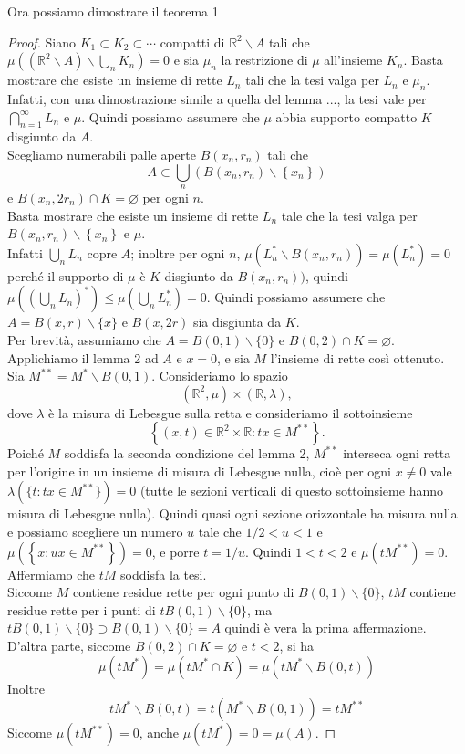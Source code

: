 \documentclass[a4paper, twoside,openright]{article}
\newcommand{\<}{\langle}
\renewcommand{\>}{\rangle}
\begin{document}
Ora possiamo dimostrare il teorema 1
\begin{proof}
Siano $K_{1} \subset K_{2} \subset \cdots$ compatti di $\mathbb{R}^{2} \backslash A$ tali che $\mu\left(\left(\mathbb{R}^{2} \backslash A\right) \backslash \bigcup_{n} K_{n}\right)=0$ e sia $\mu_{n}$ la restrizione di $\mu$ all'insieme $K_{n}$. Basta mostrare che esiste un insieme di rette $L_{n}$ tali che la tesi valga per $L_{n}$ e $\mu_{n}$. Infatti, con una dimostrazione simile a quella del lemma ..., la tesi vale per $\bigcap_{n=1}^{\infty} L_{n}$ e $\mu$. Quindi possiamo assumere che $\mu$ abbia supporto compatto $K$ disgiunto da $A$.\\
Scegliamo numerabili palle aperte $B\left(x_{n}, r_{n}\right)$ tali che
$$
A \subset \bigcup_{n}\left(B\left(x_{n}, r_{n}\right) \backslash\left\{x_{n}\right\}\right)
$$
e $B\left(x_{n}, 2 r_{n}\right) \cap K=\varnothing$ per ogni $n$.\\
Basta mostrare che esiste un insieme di rette $L_{n}$ tale che la tesi valga per $B\left(x_{n}, r_{n}\right) \backslash\left\{x_{n}\right\}$ e $\mu$.\\
Infatti $\bigcup_n L_n$ copre $A$; inoltre per ogni $n$, $\mu(L_n^* \backslash B(x_n,r_n))=\mu(L_n^*)=0$ perché il supporto di $\mu$ è $K$ disgiunto da $B(x_n,r_n))$, quindi $\mu((\bigcup_nL_n)^*) \leq \mu(\bigcup_n L_n^*)=0$. Quindi possiamo assumere che $A=B(x, r) \backslash\{x\}$ e $B(x, 2 r)$ sia disgiunta da $K$.\\
Per brevità, assumiamo che $A=B(0,1) \backslash\{0\}$ e $B(0,2) \cap K=\varnothing$. Applichiamo il lemma 2 ad $A$ e $x=0$, e sia $M$ l'insieme di rette così ottenuto.\\
Sia $M^{* *}=M^{*} \backslash B(0,1)$. Consideriamo lo spazio
$$
\left(\mathbb{R}^{2}, \mu\right) \times(\mathbb{R}, \lambda),
$$
dove $\lambda$ è la misura di Lebesgue sulla retta e consideriamo il sottoinsieme
$$
\left\{(x, t) \in \mathbb{R}^{2} \times \mathbb{R}: t x \in M^{* *}\right\} .
$$
Poiché $M$ soddisfa la seconda condizione del lemma 2, $M^{**}$ interseca ogni retta per l'origine in un insieme di misura di Lebesgue nulla, cioè per ogni $x \neq 0$ vale $\lambda(\{t: tx \in M^{**}\})=0$ (tutte le sezioni verticali di questo sottoinsieme hanno misura di Lebesgue nulla). Quindi quasi ogni sezione orizzontale ha misura nulla e possiamo scegliere un numero $u$ tale che $1 / 2<u<1$ e $\mu\left(\left\{x: u x \in M^{* *}\right\}\right)=0$, e porre $t=1 / u$. Quindi $1<t<2$ e $\mu\left(t M^{* *}\right)=0$. Affermiamo che $t M$ soddisfa la tesi.\\
Siccome $M$ contiene residue rette per ogni punto di $B(0,1) \backslash\{0\}$, $t M$ contiene residue rette per i punti di $t B(0,1) \backslash\{0\}$, ma $t B(0,1) \backslash\{0\} \supset B(0,1) \backslash\{0\}=A$ quindi è vera la prima affermazione.\\
D'altra parte, siccome $B(0,2) \cap K=\varnothing$ e $t<2$, si ha
$$
\mu\left(t M^{*}\right)=\mu\left(t M^{*} \cap K\right)=\mu\left(t M^{*} \backslash B(0, t)\right)
$$
Inoltre
$$
t M^{*} \backslash B(0, t)=t\left(M^{*} \backslash B(0,1)\right)=t M^{* *}
$$
Siccome $\mu\left(t M^{* *}\right)=0$, anche $\mu (tM^*)= 0= \mu(A)$.

\end{proof}
\end{document}
